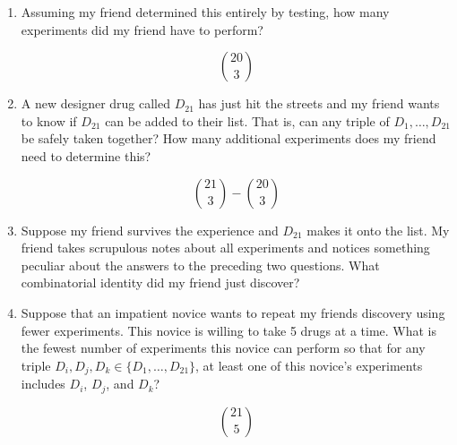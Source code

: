 \documentclass{article}
\begin{document}
\begin{enumerate}

   \item Assuming my friend determined this entirely by testing, how many experiments did my friend have to perform?

   \[
      \binom{20}{3}
   \]

   \item A new designer drug called $D_{21}$ has just hit the streets and my friend wants to know if $D_{21}$ can be added to their list. That is, can any triple of $D_1,\ldots,D_{21}$ be safely taken together? How many additional experiments does my friend need to determine this?
   
   \[
      \binom{21}{3} - \binom{20}{3} 
   \]

   \item Suppose my friend survives the experience and $D_{21}$ makes it onto the list. My friend takes scrupulous notes about all experiments and notices something peculiar about the answers to the preceding two questions. What combinatorial identity did my friend just discover?
   
   \item Suppose that an impatient novice wants to repeat my friends discovery using fewer experiments. This novice is willing to take 5 drugs at a time. What is the fewest number of experiments this novice can perform so that for any triple $D_i,D_j,D_k\in\{D_1,\ldots,D_{21}\}$, at least one of this novice's experiments includes $D_i$, $D_j$, and $D_k$?

   \[
      \binom{21}{5}   
   \]

\end{enumerate}
\end{document}
